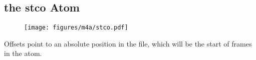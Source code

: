
\clearpage

\subsection{the stco Atom}
\label{atom:stco}
\begin{figure}[h]
  \texttt{[image: figures/m4a/stco.pdf]}
\end{figure}
\par
\noindent
Offsets point to an absolute position in the file,
which will be the start of frames in the  atom.
